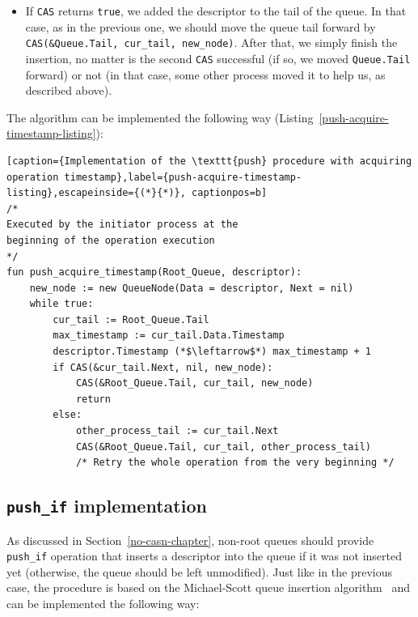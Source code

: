 \documentclass[times, dvipsnames,%
               languages={russian,english} %
              ]{itmo-student-thesis}
\begin{document}
\begin{nenum}
\begin{itemize}
        As any \texttt{CAS}, that \texttt{CAS} can be either 1) successful~--- in that case we have helped the other process and moved the queue tail forward; 2) unsuccessful~--- in that case, some other process helped before us. In either case, we simply retry the whole procedure from the from step (1).
    
        \item If \texttt{CAS} returns \texttt{true}, we added the descriptor to the tail of the queue. In that case, as in the previous one, we should move the queue tail forward by \texttt{CAS(\&Queue.Tail, cur\_tail, new\_node)}. After that, we simply finish the insertion, no matter is the second \texttt{CAS} successful (if so, we moved \texttt{Queue.Tail} forward) or not (in that case, some other process moved it to help us, as described above).
    \end{itemize}
\end{nenum}

The algorithm can be implemented the following way (Listing~\ref{push-acquire-timestamp-listing}):

\renewcommand{\lstlistingname}{Listing}
\begin{lstlisting}[caption={Implementation of the \texttt{push} procedure with acquiring operation timestamp},label={push-acquire-timestamp-listing},escapeinside={(*}{*)}, captionpos=b]
/* 
Executed by the initiator process at the 
beginning of the operation execution 
*/
fun push_acquire_timestamp(Root_Queue, descriptor):
    new_node := new QueueNode(Data = descriptor, Next = nil)
    while true:
        cur_tail := Root_Queue.Tail
        max_timestamp := cur_tail.Data.Timestamp
        descriptor.Timestamp (*$\leftarrow$*) max_timestamp + 1
        if CAS(&cur_tail.Next, nil, new_node):
            CAS(&Root_Queue.Tail, cur_tail, new_node)
            return
        else:
            other_process_tail := cur_tail.Next
            CAS(&Root_Queue.Tail, cur_tail, other_process_tail)
            /* Retry the whole operation from the very beginning */
\end{lstlisting}

\subsection{\texttt{push\_if} implementation}
\label{push-if-section}

As discussed in Section~\ref{no-casn-chapter}, non-root queues should provide \texttt{push\_if} operation that inserts a descriptor into the queue if it was not inserted yet (otherwise, the queue should be left unmodified). Just like in the previous case, the procedure is based on the Michael-Scott queue insertion algorithm~\cite{michael1996simple} and can be implemented the following way:
\end{document}
